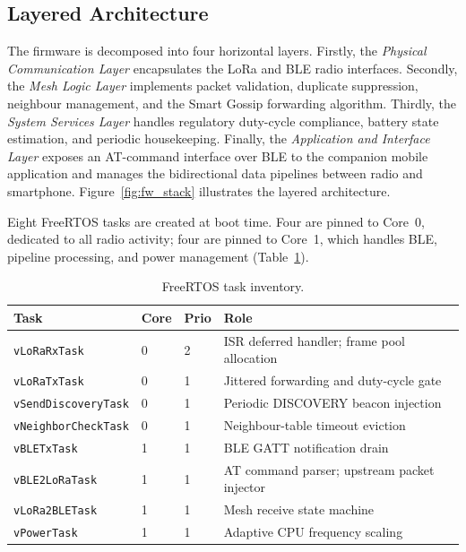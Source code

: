 \documentclass[english,bachelor]{tfgitic}[2026/01/22]
\begin{document}
\subsection{Layered Architecture}
\label{sec:fw_layers}

The firmware is decomposed into four horizontal layers. Firstly, the
\emph{Physical Communication Layer} encapsulates the LoRa and BLE radio interfaces.
Secondly, the \emph{Mesh Logic Layer} implements packet validation, duplicate suppression,
neighbour management, and the Smart Gossip forwarding algorithm. Thirdly, the
\emph{System Services Layer} handles regulatory duty-cycle compliance, battery
state estimation, and periodic housekeeping. Finally, the \emph{Application and Interface
Layer} exposes an AT-command interface over BLE to the companion mobile application
and manages the bidirectional data pipelines between radio and smartphone. Figure~\ref{fig:fw_stack} illustrates the layered architecture.



Eight FreeRTOS tasks are created at boot time. Four are pinned to Core~0, dedicated
to all radio activity; four are pinned to Core~1, which handles BLE, pipeline
processing, and power management (Table~\ref{tab:fw_tasks}).

\begin{table}[htbp]
    \centering
    \caption{FreeRTOS task inventory.}
    \label{tab:fw_tasks}
    \begin{tabular}{llll}
        \toprule
        \textbf{Task} & \textbf{Core} & \textbf{Prio} & \textbf{Role} \\
        \midrule
        \texttt{vLoRaRxTask}        & 0 & 2 & ISR deferred handler; frame pool allocation \\
        \texttt{vLoRaTxTask}        & 0 & 1 & Jittered forwarding and duty-cycle gate \\
        \texttt{vSendDiscoveryTask} & 0 & 1 & Periodic DISCOVERY beacon injection \\
        \texttt{vNeighborCheckTask} & 0 & 1 & Neighbour-table timeout eviction \\
        \texttt{vBLETxTask}         & 1 & 1 & BLE GATT notification drain \\
        \texttt{vBLE2LoRaTask}       & 1 & 1 & AT command parser; upstream packet injector \\
        \texttt{vLoRa2BLETask}       & 1 & 1 & Mesh receive state machine \\
        \texttt{vPowerTask}          & 1 & 1 & Adaptive CPU frequency scaling \\
        \bottomrule
    \end{tabular}
\end{table}
\end{document}
